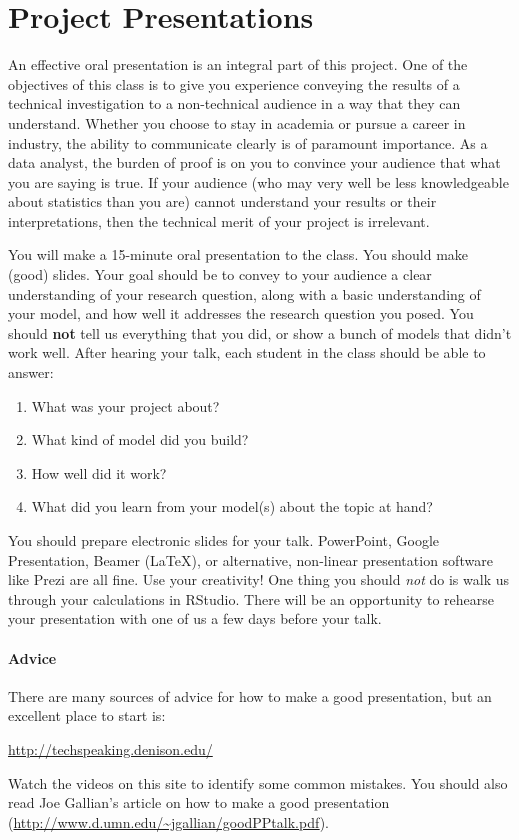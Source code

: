 \documentclass[10pt]{article}
\begin{document}
\section*{Project Presentations}

An effective oral presentation is an integral part of this project. One of the objectives of this class is to give you experience conveying the results of a technical investigation to a non-technical audience in a way that they can understand. Whether you choose to stay in academia or pursue a career in industry, the ability to communicate clearly is of paramount importance. As a data analyst, the burden of proof is on you to convince your audience that what you are saying is true. If your audience (who may very well be less knowledgeable about statistics than you are) cannot understand your results or their interpretations, then the technical merit of your project is irrelevant. 

	You will make a 15-minute oral presentation to the class. You should make (good) slides. Your goal should be to convey to your audience a clear understanding of your research question, along with a basic understanding of your model, and how well it addresses the research question you posed. You should \textbf{not} tell us everything that you did, or show a bunch of models that didn't work well. After hearing your talk, each student in the class should be able to answer: 
	\begin{enumerate}
		\item What was your project about? 
		\item What kind of model did you build? 
		\item How well did it work?  
		\item What did you learn from your model(s) about the topic at hand?
	\end{enumerate}

You should prepare electronic slides for your talk. PowerPoint, Google Presentation, Beamer (\LaTeX), or alternative, non-linear presentation software like Prezi are all fine. Use your creativity! One thing you should \emph{not} do is walk us through your calculations in RStudio. 
There will be an opportunity to rehearse your presentation with one of us a few days before your talk.

\paragraph{Advice}

There are many sources of advice for how to make a good presentation, but an excellent place to start is:
\begin{center}
	\url{http://techspeaking.denison.edu/}
\end{center}
Watch the videos on this site to identify some common mistakes. You should also read Joe Gallian's article on how to make a good presentation (\url{http://www.d.umn.edu/~jgallian/goodPPtalk.pdf}).
\end{document}
